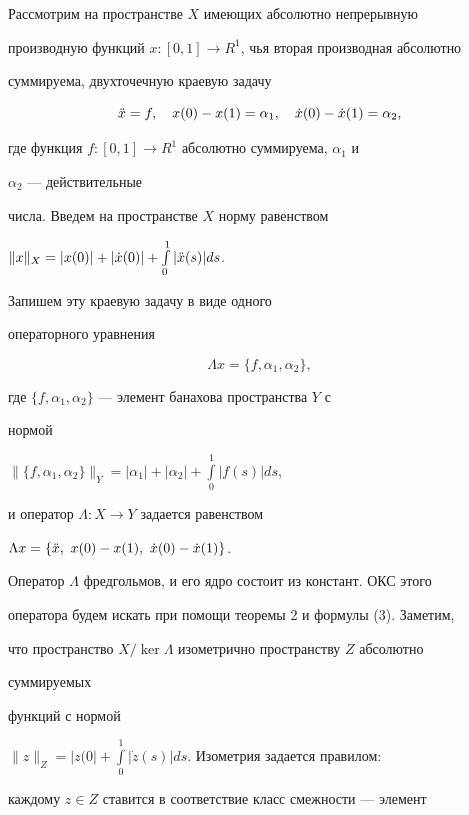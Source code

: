 \begin{exam} Рассмотрим на пространстве $X$ имеющих абсолютно непрерывную 


производную функций $x:[0,1]\to{}R^1$, чья вторая производная абсолютно 


суммируема, двухточечную краевую задачу 


$$ 


\Ddot x=f,\quad x(0)-x(1)=\alpha_1,\quad 


\Dot x(0)-\Dot x(1)=\alpha_2, 


$$ 


где функция $f:[0,1]\to{}R^1$ абсолютно суммируема, $\alpha_1$ и 


$\alpha_2$ --- действительные 


числа. Введем на пространстве $X$ норму равенством  


$\|x\|_X=|x(0)|+|\Dot x(0)|+\int\limits^1_0|\Ddot x(s)|ds$. 


Запишем эту краевую задачу в виде одного  


операторного уравнения 


$$ 


\Lambda x=\{f,\alpha_1,\alpha_2\}, 


$$ 


где $\{f,\alpha_1,\alpha_2\}$ --- элемент банахова пространства $Y$ с 


нормой 


$\|\{f,\alpha_1,\alpha_2\}\|_Y=|\alpha_1|+|\alpha_2|+ 


\int\limits^1_0|f(s)|ds$, 


и оператор $\Lambda:X\to{}Y$ задается равенством 


$\Lambda x=\{\Ddot x,\ x(0)-x(1),\ \Dot x(0)-\Dot x(1)\}$. 


 


Оператор $\Lambda$ фредгольмов, и его ядро состоит из констант. ОКС этого  


оператора будем искать при помощи теоремы 2 и формулы (3). Заметим,  


что пространство $X/\ker\Lambda$ изометрично пространству $Z$ абсолютно 


суммируемых 


функций с нормой 


$\|z\|_Z=|z(0|+\int\limits^1_0|\Dot z(s)|ds$. Изометрия задается правилом: 


каждому $z\in Z$ ставится в соответствие класс смежности --- элемент 



\end{exam}
